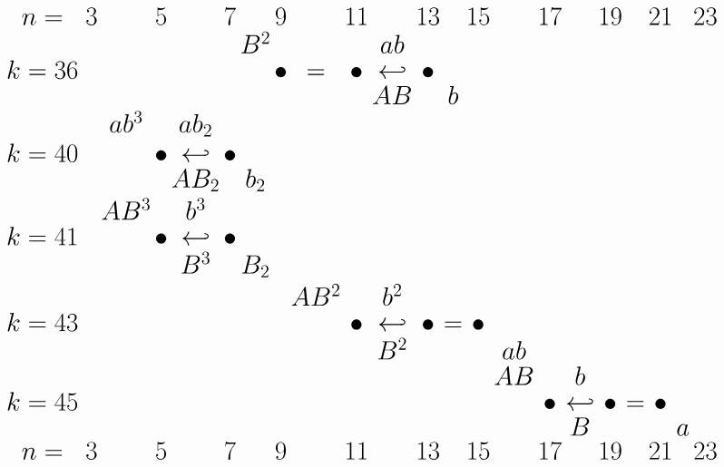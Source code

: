 \documentclass{article}
\begin{document}
\(
\begin{tikzcd}[nodes={font=\huge,inner sep=0pt},row sep=0.2cm,column sep=0.1cm]
n= & & 3 & & 5 & & 7 & & 9 & & 11 & & 13 & & 15 & & 17 & & 19 & & 21 & & 23 \\
 & & & & & & & B^2 & & & & ab \\
k=36 & & & & & & & & \bullet & = & \bullet & \hookleftarrow & \bullet \\
 & & & & & & & & & & & AB & & b \\
& & & ab^3 & & ab_2 & & \\
k=40 & & & & \bullet & \hookleftarrow & \bullet \\
 & & & & & AB_2 & & b_2 \\ 
& & & AB^3 & & b^3 & & \\
k=41 & & & & \bullet & \hookleftarrow & \bullet \\
 & & & & & B^3 & & B_2 \\
& & & & & & & & & AB^2 & & b^2 & & \\
k=43 & & & & & & & & & & \bullet & \hookleftarrow & \bullet & = & \bullet \\
 & & & & & & & & & & & B^2 & & & & ab \\ 
& & & & & & & & & & & & & & & AB & & b & & \\
k=45 & & & & & & & & & & & & & & & & \bullet & \hookleftarrow & \bullet & = & \bullet \\
& & & & & & & & & & & & & & & & & B & & & & a \\
n= & & 3 & & 5 & & 7 & & 9 & & 11 & & 13 & & 15 & & 17 & & 19 & & 21 & & 23
\end{tikzcd}
\)
\end{document}
